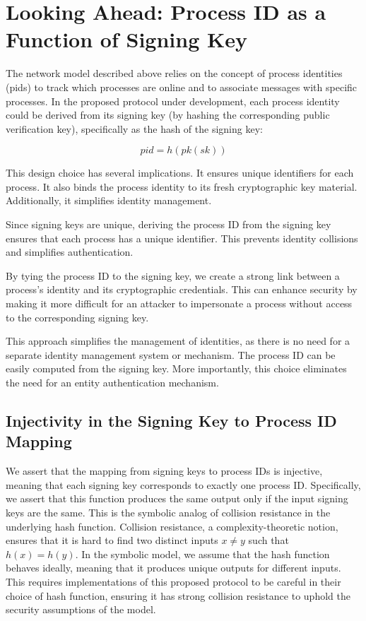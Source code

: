 \documentclass{article}
\begin{document}
\begin{minipage}{\linewidth}

\end{minipage}

\section{Looking Ahead: Process ID as a Function of Signing Key}

The network model described above relies on the concept of process identities (pids) to track which processes are online and to associate messages with specific processes.
In the proposed protocol under development, each process identity could be derived from its signing key (by hashing the corresponding public verification key), specifically as the hash of the signing key:

\begin{equation}
pid = h(pk(sk))
\end{equation}

This design choice has several implications.  
It ensures unique identifiers for each process.  
It also binds the process identity to its fresh cryptographic key material.  
Additionally, it simplifies identity management.

Since signing keys are unique, deriving the process ID from the signing key ensures that each process has a unique identifier. This prevents identity collisions and simplifies authentication.

By tying the process ID to the signing key, we create a strong link between a process's identity and its cryptographic credentials. This can enhance security by making it more difficult for an attacker to impersonate a process without access to the corresponding signing key.

This approach simplifies the management of identities, as there is no need for a separate identity management system or mechanism. The process ID can be easily computed from the signing key.   More importantly, this choice eliminates the need for an entity authentication mechanism.

\subsection{Injectivity in the Signing Key to Process ID Mapping}

We assert that the mapping from signing keys to process IDs is injective, meaning that each signing key corresponds to exactly one process ID.
Specifically, we assert that this function produces the same output only if the input signing keys are the same.
This is the symbolic analog of collision resistance in the underlying hash function.
Collision resistance, a complexity-theoretic notion, ensures that it is hard to find two distinct inputs $x \neq y$ such that $h(x)=h(y)$.
In the symbolic model, we assume that the hash function behaves ideally, meaning that it produces unique outputs for different inputs.
This requires implementations of this proposed protocol to be careful in their choice of hash function, ensuring it has strong collision resistance to uphold the security assumptions of the model.

\printglossaries
\printbibliography
\end{document}
